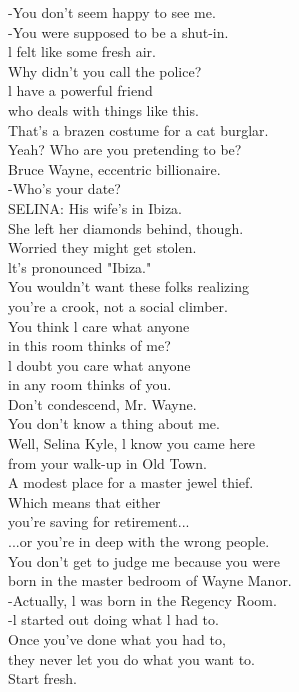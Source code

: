 \documentclass{article}
\begin{document}
\begin{multicols}{3}
-You don't seem happy to see me.\\
-You were supposed to be a shut-in.\\
l felt like some fresh air.\\
Why didn't you call the police?\\
l have a powerful friend\\
who deals with things like this.\\
That's a brazen costume for a cat burglar.\\
Yeah? Who are you pretending to be?\\
Bruce Wayne, eccentric billionaire.\\
-Who's your date?\\
SELINA: His wife's in Ibiza.\\
She left her diamonds behind, though.\\
Worried they might get stolen.\\
lt's pronounced "Ibiza."\\
You wouldn't want these folks realizing\\
you're a crook, not a social climber.\\
You think l care what anyone\\
in this room thinks of me?\\
l doubt you care what anyone\\
in any room thinks of you.\\
Don't condescend, Mr. Wayne.\\
You don't know a thing about me.\\
Well, Selina Kyle, l know you came here\\
from your walk-up in Old Town.\\
A modest place for a master jewel thief.\\
Which means that either\\
you're saving for retirement...\\
...or you're in deep with the wrong people.\\
You don't get to judge me because you were\\
born in the master bedroom of Wayne Manor.\\
-Actually, l was born in the Regency Room.\\
-l started out doing what l had to.\\
Once you've done what you had to,\\
they never let you do what you want to.\\
Start fresh.\\

\end{multicols}
\end{document}
